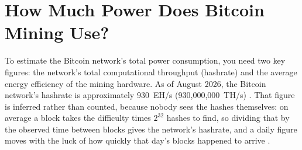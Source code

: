 \section[How Much Power Does Bitcoin Mining Use?]{How Much Power Does Bitcoin\\ Mining Use?}
\label{sec:bitcoin_consumption_own_computation}

To estimate the Bitcoin network's total power consumption, you need two key figures: the network's total computational throughput (hashrate) and the average energy efficiency of the mining hardware. As of August 2026, the Bitcoin network's hashrate is approximately 930~EH/s (930,000,000~TH/s) \autocite{BraiinsInsights}. %
That figure is inferred rather than counted, because nobody sees the hashes themselves: on average a block takes the difficulty times $2^{32}$ hashes to find, so dividing that by the observed time between blocks gives the network's hashrate, and a daily figure moves with the luck of how quickly that day's blocks happened to arrive \autocite{stoll2018ceepr}. %
